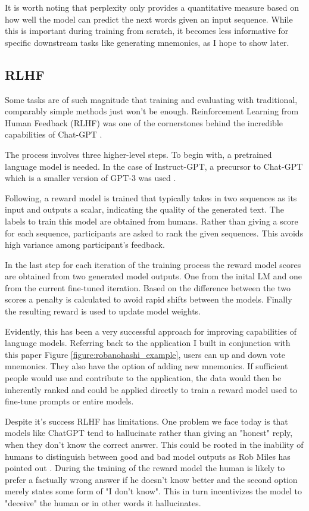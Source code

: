 It is worth noting that perplexity only provides a quantitative measure based on how well the model can predict the next words given an input sequence. While this is important during training from scratch, it becomes less informative for specific downstream tasks like generating mnemonics, as I hope to show later.

\subsection{RLHF}
Some tasks are of such magnitude that training and evaluating with traditional, comparably simple methods just won't be enough. Reinforcement Learning from Human Feedback (RLHF) was one of the cornerstones behind the incredible capabilities of Chat-GPT \cite{lambert2022rlhf}.

The process involves three higher-level steps. To begin with, a pretrained language model is needed. In the case of Instruct-GPT, a precursor to Chat-GPT which is a smaller version of GPT-3 was used \cite{lambert2022rlhf}.

Following, a reward model is trained that typically takes in two sequences as its input and outputs a scalar, indicating the quality of the generated text. The labels to train this model are obtained from humans. Rather than giving a score for each sequence, participants are asked to rank the given sequences. This avoids high variance among participant's feedback.

In the last step for each iteration of the training process the reward model scores are obtained from two generated model outputs. One from the inital LM and one from the current fine-tuned iteration. Based on the difference between the two scores a penalty is calculated to avoid rapid shifts between the models. Finally the resulting reward is used to update model weights. 

Evidently, this has been a very successful approach for improving capabilities of language models. Referring back to the application I built in conjunction with this paper Figure \ref{figure:robanohashi_example}, users can up and down vote mnemonics. They also have the option of adding new mnemonics. If sufficient people would use and contribute to the application, the data would then be inherently ranked and could be applied directly to train a reward model used to fine-tune prompts or entire models.

Despite it's success RLHF has limitations. One problem we face today is that models like ChatGPT tend to hallucinate rather than giving an "honest" reply, when they don't know the correct answer. This could be rooted in the inability of humans to distinguish between good and bad model outputs as Rob Miles has pointed out \cite{miles_chatgpt}. During the training of the reward model the human is likely to prefer a factually wrong answer if he doesn't know better and the second option merely states some form of "I don't know". This in turn incentivizes the model to "deceive" the human or in other words it hallucinates.

